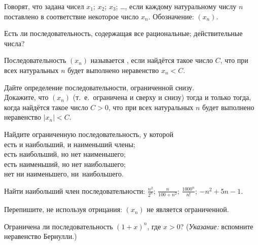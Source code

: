\documentclass[a4paper, 11pt]{article}
\begin{document}


 Говорят, что задана  чисел
$x_1$; $x_2$; $x_3$; \dots ,  если каждому натуральному
числу $n$ поставлено в соответствие некоторое число $x_n$.
Обозначение: $(x_n)$.  

Есть ли последовательность, содержащая все  рациональные;  действительные числа?

 Последовательность $(x_n)$ называется ,
если найд\"ется такое число $C$, что при всех натуральных $n$
будет выполнено неравенство $x_n<C$.

 Дайте определение последовательности, ограниченной снизу.\\
 Докажите, что %
$(x_n)$ 
(т.~е.~ограничена и сверху и снизу) тогда и только тогда, когда
найд\"ется такое число $C>0$, что при всех натуральных $n$
будет выполнено неравенство $|x_n|<C$.


 Найдите ограниченную последовательность, у которой\\
  есть и наибольший, и наименьший члены;\\
  есть наибольший, но нет наименьшего;\\
  есть наименьший, но нет наибольшего;\\
  нет ни наименьшего, ни~\hbox{наибольшего.}


 Найти наибольший член последовательности:
 $\frac{n^2}{2^n}$;
 $\frac{n}{100+n^2}$;
 $\frac{1000^n}{n!}$;
 $-n^2+5n-1$.


Перепишите, не используя отрицания:
 $(x_n)$ не  является ограниченной.


Ограничена ли последовательность $(1+x)^n$, где $x>0$? ({\it Указание:} вспомните неравенство Бернулли.)
\end{document}
